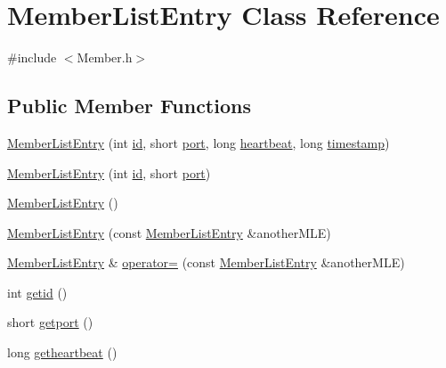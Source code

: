 \hypertarget{class_member_list_entry}{\section{\-Member\-List\-Entry \-Class \-Reference}
\label{db/dac/class_member_list_entry}
}


{\ttfamily \#include $<$\-Member.\-h$>$}

\subsection*{\-Public \-Member \-Functions}
\begin{DoxyCompactItemize}
\item 
\hyperlink{class_member_list_entry_ae96dafcf41fa55a43bbcb3f2a743e3bb}{\-Member\-List\-Entry} (int \hyperlink{class_member_list_entry_a569594f798c011bec978d7de9af9e87c}{id}, short \hyperlink{class_member_list_entry_ae85ba26966dc188c7fec4c298fb47a81}{port}, long \hyperlink{class_member_list_entry_ae01ac985a9a529b0046bc463e97b9a52}{heartbeat}, long \hyperlink{class_member_list_entry_ae15f1e7b93b9f19be264930c783615cc}{timestamp})
\item 
\hyperlink{class_member_list_entry_a7dc425a7913a0468b33277adeab9d522}{\-Member\-List\-Entry} (int \hyperlink{class_member_list_entry_a569594f798c011bec978d7de9af9e87c}{id}, short \hyperlink{class_member_list_entry_ae85ba26966dc188c7fec4c298fb47a81}{port})
\item 
\hyperlink{class_member_list_entry_a7d0e5b26b9dc655522b886a21b863254}{\-Member\-List\-Entry} ()
\item 
\hyperlink{class_member_list_entry_a598e8c2d3d3bf739ed5ec7c0b979ed0f}{\-Member\-List\-Entry} (const \hyperlink{class_member_list_entry}{\-Member\-List\-Entry} \&another\-M\-L\-E)
\item 
\hyperlink{class_member_list_entry}{\-Member\-List\-Entry} \& \hyperlink{class_member_list_entry_a36019bb9132966f4754db0a8b775875a}{operator=} (const \hyperlink{class_member_list_entry}{\-Member\-List\-Entry} \&another\-M\-L\-E)
\item 
int \hyperlink{class_member_list_entry_a3ff3ece6127fa1e69114f267719749ff}{getid} ()
\item 
short \hyperlink{class_member_list_entry_a5feb1389ab87715ac4450cbf38a813c7}{getport} ()
\item 
long \hyperlink{class_member_list_entry_a5d53c814f1ef40765cf4cf677a6e857d}{getheartbeat} ()
\item 

\end{DoxyCompactItemize}
